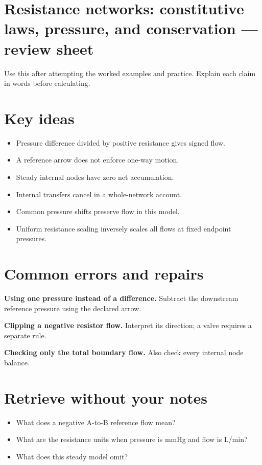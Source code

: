 \documentclass[11pt,letterpaper]{article}
\theoremstyle{definition}\newtheorem{definition}{Definition}\newtheorem{example}{Example}
\numberwithin{equation}{section}
\begin{document}
\section*{Resistance networks: constitutive laws, pressure, and conservation --- review sheet}
Use this after attempting the worked examples and practice. Explain each claim in words before calculating.

\section*{Key ideas}
\begin{itemize}
\item Pressure difference divided by positive resistance gives signed flow.
\item A reference arrow does not enforce one-way motion.
\item Steady internal nodes have zero net accumulation.
\item Internal transfers cancel in a whole-network account.
\item Common pressure shifts preserve flow in this model.
\item Uniform resistance scaling inversely scales all flows at fixed endpoint pressures.
\end{itemize}
\section*{Common errors and repairs}
\textbf{Using one pressure instead of a difference.} Subtract the downstream reference pressure using the declared arrow.

\textbf{Clipping a negative resistor flow.} Interpret its direction; a valve requires a separate rule.

\textbf{Checking only the total boundary flow.} Also check every internal node balance.

\section*{Retrieve without your notes}
\begin{itemize}
\item What does a negative A-to-B reference flow mean?
\item What are the resistance units when pressure is mmHg and flow is L/min?
\item What does this steady model omit?
\end{itemize}
\end{document}
